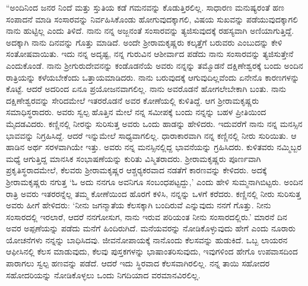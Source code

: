 “ಅಂದಿನಿಂದ ಜನರ ನಿಂದೆ ಮತ್ತು ಸ್ತುತಿಯ ಕಡೆ ಗಮನವನ್ನು ಕೊಡುತ್ತಿರಲಿಲ್ಲ. ಸಾಧಾರಣ ಮನುಷ್ಯರಂತೆ ಹಣ ಸಂಪಾದನೆ ಮಾಡಿ ಸಂಸಾರವನ್ನು ನಿರ್ವಹಿಸಿಕೊಂಡು ಹೋಗುವುದಕ್ಕಾಗಲಿ, ವಿಷಯ ಸುಖವನ್ನು ಪಡೆಯುವುದಕ್ಕಾಗಲಿ ನಾನು ಹುಟ್ಟಿಲ್ಲ ಎಂದು ತಿಳಿದೆ. ನಾನು ನನ್ನ ಅಜ್ಜನಂತೆ ಸಂಸಾರವನ್ನು ತ್ಯಜಿಸುವುದಕ್ಕೆ ರಹಸ್ಯವಾಗಿ ಅಣಿಯಾಗುತ್ತಿದ್ದೆ. ಅದಕ್ಕಾಗಿ ನಾನು ದಿನವನ್ನು ಗೊತ್ತು ಮಾಡಿದೆ. ಅಂದೇ ಶ‍್ರೀರಾಮಕೃಷ್ಣರು ಕಲ್ಕತ್ತೆಗೆ ಬರುವರು ಎಂಬುದನ್ನು ಕೇಳಿ ಸಂತೋಷವಾಯಿತು. ಇದು ನನ್ನ ಅದೃಷ್ಟ, ನನ್ನ ಗುರುವಿನ ಆಶೀರ್ವಾದ ಪಡೆದು ನಾನು ಸಂಸಾರವನ್ನು ತ್ಯಜಿಸುತ್ತೇನೆ ಎಂದುಕೊಂಡೆ. ನಾನು ಶ‍್ರೀಗುರುದೇವನನ್ನು ಕಂಡೊಡನೆಯೆ ಅವರು ನನ್ನನ್ನು ತಮ್ಮೊಡನೆ ದಕ್ಷಿಣೇಶ್ವರಕ್ಕೆ ಬಂದು ಅಂದಿನ ರಾತ್ರಿಯನ್ನು ಕಳೆಯಬೇಕೆಂದು ಒತ್ತಾಯಮಾಡಿದರು. ನಾನು ಬರುವುದಕ್ಕೆ ಆಗುವುದಿಲ್ಲವೆಂದು ಏನೇನೊ ಕಾರಣಗಳನ್ನು ಕೊಟ್ಟೆ. ಆದರೆ ಅದರಿಂದ ಏನೂ ಪ್ರಯೋಜನವಾಗಲಿಲ್ಲ. ನಾನು ಅವರೊಡನೆ ಹೋಗಲೇಬೇಕಾಗಿ ಬಂತು. ನಾನು ದಕ್ಷಿಣೇಶ್ವರವನ್ನು ಸೇರಿದಮೇಲೆ ಇತರರೊಡನೆ ಅವರ ಕೋಣೆಯಲ್ಲಿ ಕುಳಿತಿದ್ದೆ. ಆಗ ಶ‍್ರೀರಾಮಕೃಷ್ಣರು ಸಮಾಧಿಸ್ಥರಾದರು. ಅವರು ಸ್ವಲ್ಪ ಹೊತ್ತಿನ ಮೇಲೆ ನನ್ನ ಸಮೀಪಕ್ಕೆ ಬಂದು ನನ್ನನ್ನು ಬಹಳ ಪ್ರೀತಿಯಿಂದ ಮೈದಡವಿದರು. ಕಣ್ಣಿನಲ್ಲಿ ನೀರನ್ನು ಸುರಿಸುತ್ತ ಅವರು ಒಂದು ಹಾಡನ್ನು ಹೇಳಿದರು. ಇದುವರೆಗೆ ನಾನು ನನ್ನ ಮನಸ್ಸಿನ ಭಾವವನ್ನು ನಿಗ್ರಹಿಸಿದ್ದೆ. ಆದರೆ ಇನ್ನುಮೇಲೆ ಸಾಧ್ಯವಾಗಲಿಲ್ಲ. ಧಾರಾಕಾರವಾಗಿ ನನ್ನ ಕಣ್ಣಿನಲ್ಲಿ ನೀರು ಸುರಿಯಿತು. ಆ ಹಾಡಿನ ಅರ್ಥ ಸರಳವಾಗಿಯೇ ಇತ್ತು. ಅವರು ನನ್ನ ಮನಸ್ಸಿನಲ್ಲಿದ್ದ ಭಾವನೆಯನ್ನು ಗ್ರಹಿಸಿದರು. ಕುಳಿತವರು ನಮ್ಮಿಬ್ಬರ ಮಧ್ಯೆ ಆಗುತ್ತಿದ್ದ ಮಾನಸಿಕ ಸಂಭಾಷಣೆಯನ್ನು ಕುರಿತು ವಿಸ್ಮಿತರಾದರು. ಶ‍್ರೀರಾಮಕೃಷ್ಣರು ಪೂರ್ಣವಾಗಿ ಪ್ರಕೃತಿಸ್ಥರಾದಮೇಲೆ, ಕೆಲವರು ಶ‍್ರೀರಾಮಕೃಷ್ಣರ ಆಶ್ಚರ‍್ಯಕರವಾದ ನಡತೆಗೆ ಕಾರಣವನ್ನು ಕೇಳಿದರು. ಅದಕ್ಕೆ ಶ‍್ರೀರಾಮಕೃಷ್ಣರು ನಗುತ್ತ ‘ಓ ಅದು ನನಗೂ ಅವನಿಗೂ ಸಂಬಂಧಪಟ್ಟದ್ದು,’ ಎಂದು ಹೇಳಿ ಸುಮ್ಮನಾಗಿಬಿಟ್ಟರು. ಅಂದಿನ ರಾತ್ರಿ ಅವರು ಇತರರನ್ನೆಲ್ಲ ತಮ್ಮ ಕೋಣೆಯಿಂದ ಹೊರಗೆ ಕಳಿಸಿ, ನನ್ನನ್ನು ಒಳಗೆ ಕರೆದರು. ಕಣ್ಣಿನಲ್ಲಿ ನೀರು ಸುರಿಸುತ್ತ ಅವರು ಹೀಗೆ ಹೇಳಿದರು: ‘ನೀನು ಜಗನ್ಮಾತೆಯ ಕೆಲಸಕ್ಕಾಗಿ ಬಂದಿರುವೆ ಎನ್ನುವುದು ನನಗೆ ಗೊತ್ತು. ನೀನು ಸಂಸಾರದಲ್ಲಿ ಇರಲಾರೆ, ಆದರೆ ನನಗೋಸುಗ, ನಾನು ಇರುವ ಪರಿಯಂತ ನೀನು ಸಂಸಾರದಲ್ಲಿರು.’ ಮಾರನೆ ದಿನ ಅವರ ಅಪ್ಪಣೆಯನ್ನು ಪಡೆದು ಮನೆಗೆ ಹಿಂದಿರುಗಿದೆ. ಮನೆಯವರನ್ನು ನೋಡಿಕೊಳ್ಳುವುದು ಹೇಗೆ ಎಂದು ನೂರಾರು ಯೋಚನೆಗಳು ನನ್ನನ್ನು ಬಾಧಿಸಿದವು. ಜೀವನೋಪಾಯಕ್ಕೆ ನಾನೊಂದು ಕೆಲಸವನ್ನು ಹುಡುಕಿದೆ. ಒಬ್ಬ ಲಾಯರನ ಆಫೀಸಿನಲ್ಲಿ ಕೆಲಸ ಮಾಡುವುದು, ಕೆಲವು ಪುಸ್ತಕಗಳನ್ನು ಭಾಷಾಂತರಿಸುವುದು, ಇವುಗಳಿಂದ ಹೇಗೊ ಉಪವಾಸದಿಂದ ಪಾರಾಗಲು ಸ್ವಲ್ಪ ಹಣವನ್ನು ಪಡೆದೆ. ಆದರೆ ಇದು ಸ್ಥಿರವಾದ ಕೆಲಸವಾಗಿರಲಿಲ್ಲ. ನನ್ನ ತಾಯಿ ಸಹೋದರ ಸಹೋದರಿಯನ್ನು ನೋಡಿಕೊಳ್ಳಲು ಒಂದು ನಿಗದಿಯಾದ ವರಮಾನವಿರಲಿಲ್ಲ.

